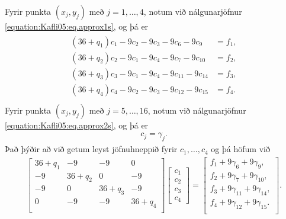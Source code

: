 \documentclass[a4paper,10pt,icelandic]{sphinxmanual}
\begin{document}

Fyrir punkta \((x_j,y_j)\) með \(j=1, \dots, 4\), notum við nálgunarjöfnur \eqref{equation:Kafli05:eq.approx1s}, og þá er
\begin{equation*}
\begin{split}\begin{aligned}
(36+q_1)c_1-9c_2-9c_3-9c_6-9c_9&=f_1,\\
(36+q_2)c_2-9c_1-9c_4-9c_7-9c_{10}&=f_2,\\
(36+q_3)c_3-9c_1-9c_4-9c_{11}-9c_{14}&=f_3,\\
(36+q_4)c_4-9c_2-9c_3-9c_{12}-9c_{15}&=f_4.\\\end{aligned}\end{split}
\end{equation*}
Fyrir punkta \((x_j,y_j)\) með  \(j=5,\dots, 16\), notum við nálgunarjöfnur \eqref{equation:Kafli05:eq.approx2s}, og þá er
\begin{equation*}
\begin{split}c_j = \gamma_j.\end{split}
\end{equation*}
Það þýðir að við getum leyst jöfnuhneppið fyrir \(c_1, \dots, c_4\) og þá höfum við
\begin{equation*}
\begin{split}\left[  \begin{matrix}
36+q_1&-9&-9& 0\\
-9&36+q_2&0&-9\\
-9&0&36+q_3&-9\\
0&-9&-9&36+q_4\\
\end{matrix}\right]
\left[
\begin{matrix}
c_1\\c_2\\c_3\\c_4
\end{matrix}
\right]
=\left[
\begin{matrix}
f_1+9\gamma_6+9\gamma_9,\\
f_2+9\gamma_7+9\gamma_{10},\\
f_3+9\gamma_{11}+9\gamma_{14},\\
f_4+9\gamma_{12}+9\gamma_{15}.\\
\end{matrix}
\right].\end{split}
\end{equation*}
\end{document}
